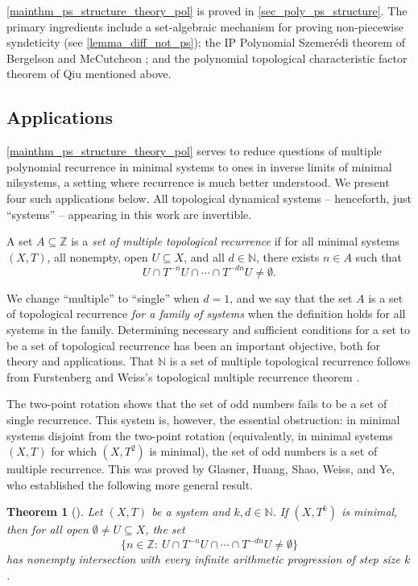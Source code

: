 \documentclass{article}
\theoremstyle{plain}
\newtheorem{theorem}[Theorem]{Theorem}
\theoremstyle{claim}
\theoremstyle{definition}
\theoremstyle{plain}
\theoremstyle{plain}
\newcommand{\Szemeredi}{Szemer\'{e}di}
\newcommand{\N}{\mathbb{N}}
\newcommand{\Z}{\mathbb{Z}}
\newcommand{\1}{\boldsymbol{1}}
\begin{document}
\cref{mainthm_ps_structure_theory_pol} is proved in \cref{sec_poly_ps_structure}.  The primary ingredients include a set-algebraic mechanism for proving non-piecewise syndeticity (see \cref{lemma_diff_not_ps}); the IP Polynomial \Szemeredi{} theorem of Bergelson and McCutcheon \cite[Lemma 6.12]{Bergelson_McCutcheon00}; and the polynomial topological characteristic factor theorem of Qiu \cite[Theorem~B]{Qiu23} mentioned above.

\subsection{Applications}
\label{sec_applications_intro}

\cref{mainthm_ps_structure_theory_pol} serves to reduce questions of multiple polynomial recurrence in minimal systems to ones in inverse limits of minimal nilsystems, a setting where recurrence is much better understood. We present four such applications below. All topological dynamical systems -- henceforth, just ``systems'' -- appearing in this work are invertible.

A set $A \subseteq \Z$ is a {\it set of multiple topological recurrence} if for all minimal systems $(X,T)$, all nonempty, open $U \subseteq X$, and all $d \in \N$, there exists $n \in A$ such that
\[
    U \cap T^{-n} U \cap \cdots \cap T^{-dn} U \neq \emptyset.
\]

We change ``multiple'' to ``single'' when $d = 1$, and we say that the set $A$ is a set of topological recurrence {\it for a family of systems} when the definition holds for all systems in the family.
Determining necessary and sufficient conditions for a set to be a set of topological recurrence has been an important objective, both for theory and applications.
That $\N$ is a set of multiple topological recurrence follows from Furstenberg and Weiss's topological multiple recurrence theorem \cite[Theorem~1.4]{Furstenberg_Weiss78}.


The two-point rotation shows that the set of odd numbers fails to be a set of single recurrence. 
This system is, however, the essential obstruction: in minimal systems disjoint from the two-point rotation (equivalently, in minimal systems $(X,T)$ for which $(X,T^2)$ is minimal), the set of odd numbers is a set of multiple recurrence.  
This was proved by Glasner, Huang, Shao, Weiss, and Ye, who established the following more general result.

\begin{theorem}[{\cite[Theorem D]{glasner_huang_shao_weiss_ye_2020}}]
\label{thm:odd-recurrence-linear-glasner}
Let $(X,T)$ be a system and $k, d \in \N$. 
If $(X,T^k)$ is minimal, then for all open $\emptyset\neq U \subseteq X$, the set 
\[\big\{ n \in \Z : \ U \cap T^{-n} U \cap \cdots \cap T^{-dn} U \neq \emptyset \big\}\]
has nonempty intersection with every infinite arithmetic progression of step size $k$.
\end{theorem}
\end{document}
